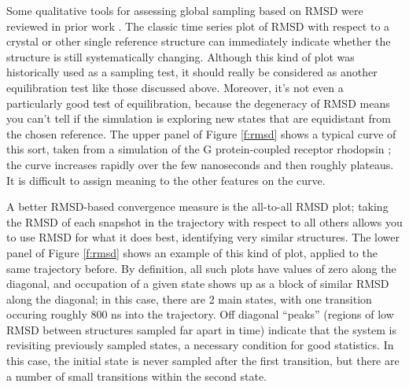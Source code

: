 Some qualitative tools for assessing global sampling based on RMSD were reviewed
in prior work \cite{Grossfield2009}.   The classic time series plot of RMSD with
respect to a crystal or other single reference structure can immediately
indicate whether the structure is still systematically changing.  Although this
kind of plot was historically used as a sampling test, it should really be
considered as another equilibration test like those discussed above.  Moreover,
it's not even a particularly good test of equilibration, because the degeneracy
of RMSD means you can't tell if the simulation is exploring new states that are
equidistant from the chosen reference.  The upper panel of Figure \ref{f:rmsd}
shows a typical curve of this sort, taken from a simulation of the G
protein-coupled receptor rhodopsin \cite{Grossfield-2015}; the curve increases
rapidly over the few nanoseconds and then roughly plateaus.  It is difficult to
assign meaning to the other features on the curve.

A better RMSD-based convergence measure is the all-to-all RMSD plot; taking the
RMSD of each snapshot in the trajectory with respect to all others allows you to
use RMSD for what it does best, identifying very similar structures.  The lower
panel of Figure \ref{f:rmsd} shows an example of this kind of plot, applied to
the same trajectory before.  By definition, all such plots have values of zero
along the diagonal, and occupation of a given state shows up as a block of
similar RMSD along the diagonal; in this case, there are 2 main states, with one
transition occuring roughly 800 ns into the trajectory.  Off diagonal ``peaks''
(regions of low RMSD between structures sampled far apart in time) indicate that
the system is revisiting previously sampled states, a necessary condition for
good statistics.  In this case, the initial state is never sampled after the
first transition, but there are a number of small transitions within the second
state.

